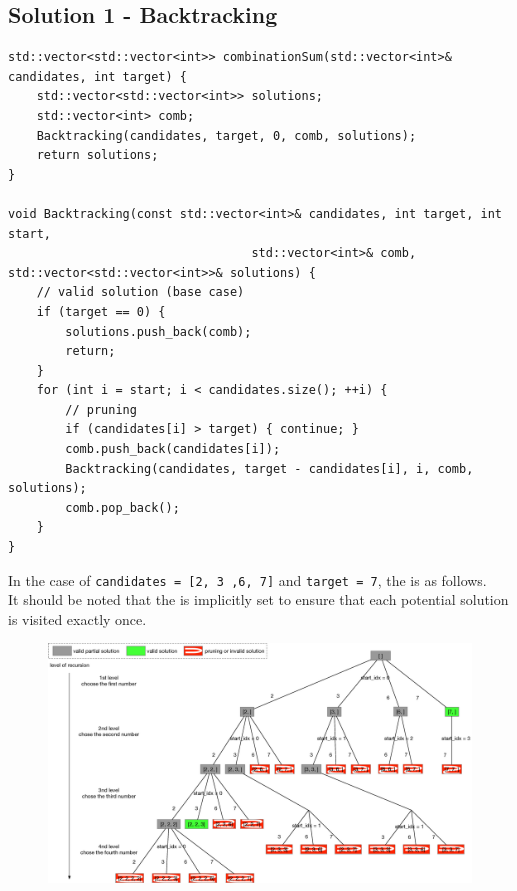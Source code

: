 \subsection*{Solution 1 - Backtracking}
\begin{lstlisting}
std::vector<std::vector<int>> combinationSum(std::vector<int>& candidates, int target) {
	std::vector<std::vector<int>> solutions;
	std::vector<int> comb;
	Backtracking(candidates, target, 0, comb, solutions);
	return solutions;
}

void Backtracking(const std::vector<int>& candidates, int target, int start, 
								  std::vector<int>& comb, std::vector<std::vector<int>>& solutions) {
	// valid solution (base case)
	if (target == 0) {
		solutions.push_back(comb);
		return;
	}
	for (int i = start; i < candidates.size(); ++i) {
		// pruning
		if (candidates[i] > target) { continue; }
		comb.push_back(candidates[i]);
		Backtracking(candidates, target - candidates[i], i, comb, solutions);
		comb.pop_back();
	}
}
\end{lstlisting}\mbox{}

In the case of {\colorbox{CodeBackground}{\lstinline|candidates = [2, 3 ,6, 7]|}} and {\colorbox{CodeBackground}{\lstinline|target = 7|}}, the {\color{blue}{potential search tree}} is as follows. \\

It should be noted that the {\color{blue}{search order}} is implicitly set to ensure that each potential solution is visited exactly once.

\begin{figure}[H]
	\centering
	\includegraphics[width=1.0\linewidth]{images/lc0039_pst}
	\label{fig:lc0039pst}
\end{figure}

